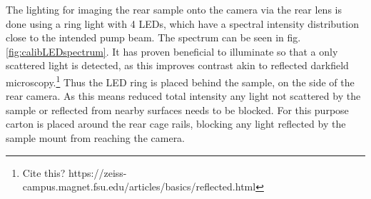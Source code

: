\documentclass[twoside,openright]{scrreprt}
\begin{document}
The lighting for imaging the rear sample onto the camera via the rear lens is done using a ring light with 4 LEDs, which have a spectral intensity distribution close to the intended pump beam. The spectrum can be seen in fig. \ref{fig:calibLEDspectrum}.
It has proven beneficial to illuminate so that a only scattered light is detected, as this improves contrast akin to reflected darkfield microscopy.\footnote{Cite this? https://zeiss-campus.magnet.fsu.edu/articles/basics/reflected.html} Thus the LED ring is placed behind the sample, on the side of the rear camera. As this means reduced total intensity any light not scattered by the sample or reflected from nearby surfaces needs to be blocked. For this purpose carton is placed around the rear cage rails, blocking any light reflected by the sample mount from reaching the camera.
\end{document}
